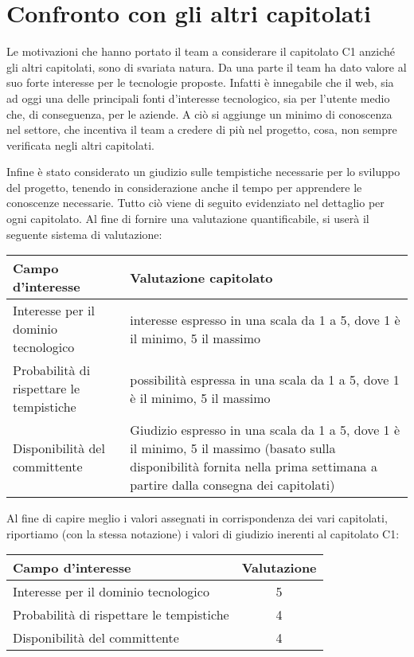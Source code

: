 \section{Confronto con gli altri capitolati}
Le motivazioni che hanno portato il team a considerare il capitolato C1 anziché gli altri capitolati, sono di svariata natura. Da una parte il team ha dato valore al suo forte interesse per le tecnologie proposte. Infatti è innegabile che il web, sia ad oggi una delle principali fonti d'interesse tecnologico, sia per l'utente medio che, di conseguenza, per le aziende. A ciò si aggiunge un minimo di conoscenza nel settore, che incentiva il team a credere di più nel progetto, cosa, non sempre verificata negli altri capitolati. 

Infine è stato considerato un giudizio sulle tempistiche necessarie per lo sviluppo del progetto, tenendo in considerazione anche il tempo per apprendere le conoscenze necessarie. Tutto ciò viene di seguito evidenziato nel dettaglio per ogni capitolato. Al fine di fornire una valutazione quantificabile, si userà il seguente sistema di valutazione:\\

\begin{center}
\begin{tabularx}{.9\textwidth}{lX}
\toprule
Campo d'interesse & Valutazione capitolato\\
\midrule %
Interesse per il dominio tecnologico & interesse espresso in una scala da 1 a 5, dove 1 è il minimo, 5 il massimo\\
Probabilità di rispettare le tempistiche & possibilità espressa in una scala da 1 a 5, dove 1 è il minimo, 5 il massimo\\
Disponibilità del committente & Giudizio espresso in una scala da 1 a 5, dove 1 è il minimo, 5 il massimo (basato sulla disponibilità fornita nella prima settimana a partire dalla consegna dei capitolati)\\
\bottomrule
\end{tabularx}
\end{center}

Al fine di capire meglio i valori assegnati in corrispondenza dei vari capitolati, riportiamo (con la stessa notazione) i valori di giudizio inerenti al capitolato C1:

\begin{center}
\begin{tabular}{lc}
\toprule
Campo d'interesse & Valutazione\\
\midrule %
Interesse per il dominio tecnologico & 5\\
Probabilità di rispettare le tempistiche & 4\\
Disponibilità del committente & 4\\
\bottomrule
\end{tabular}
\end{center}

